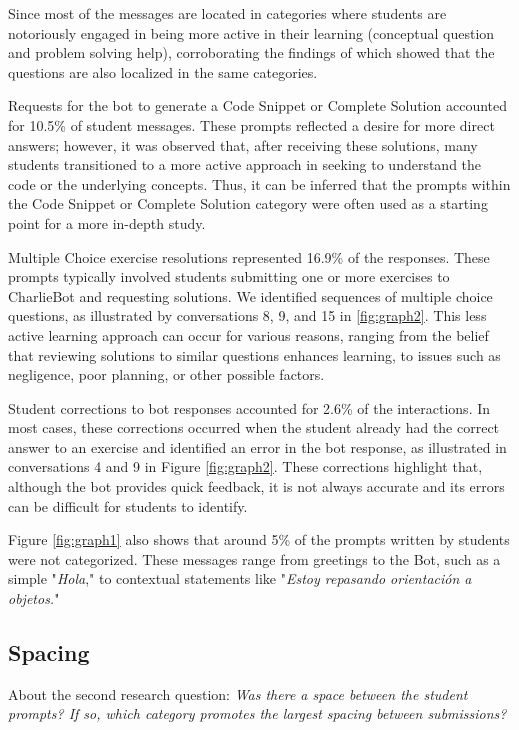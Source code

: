 \documentclass[a4paper,twoside]{article}
\begin{document}
Since most of the messages are located in categories where students are
notoriously engaged in being more active in their learning (conceptual question
and problem solving help), corroborating the findings of \cite{Ghimire24} which
showed that the questions are also localized in the same categories.

Requests for the bot to generate a Code Snippet or Complete Solution accounted
for 10.5\% of student messages. These prompts reflected a desire for more
direct answers; however, it was observed that, after receiving these solutions,
many students transitioned to a more active approach in seeking to understand
the code or the underlying concepts. Thus, it can be inferred that the prompts
within the Code Snippet or Complete Solution category were often used as a
starting point for a more in-depth study.

Multiple Choice exercise resolutions represented 16.9\% of the responses.
These prompts typically involved students submitting one or more exercises to
CharlieBot and requesting solutions. We identified sequences of multiple choice
questions, as illustrated by conversations 8, 9, and 15 in \ref{fig:graph2}.
This less active learning approach can occur for various reasons, ranging from
the belief that reviewing solutions to similar questions enhances learning, to
issues such as negligence, poor planning, or other possible factors.

Student corrections to bot responses accounted for 2.6\% of the
interactions. In most cases, these corrections occurred when the student already
had the correct answer to an exercise and identified an error in the bot
response, as illustrated in conversations 4 and 9 in Figure \ref{fig:graph2}.
These corrections highlight that, although the bot provides quick feedback, it
is not always accurate and its errors can be difficult for students to
identify.

Figure \ref{fig:graph1} also shows that around 5\% of the prompts written by
students were not categorized. These messages range from greetings to the Bot,
such as a simple "\textit{Hola}," to contextual statements like
"\textit{Estoy repasando orientación a objetos.}"

\subsection{Spacing}


About the second research question: \textit{Was there a space between the student
prompts? If so, which category promotes the largest spacing between
submissions?}
\end{document}
